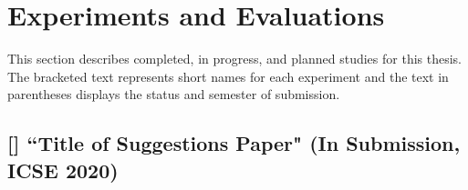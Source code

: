 \section{Experiments and Evaluations}

This section describes completed, in progress, and planned studies for this thesis. The bracketed text represents short names for each experiment and the text in parentheses displays the status and semester of submission.



\subsection{[\sugg] ``Title of Suggestions Paper" (In Submission, ICSE 2020)}

